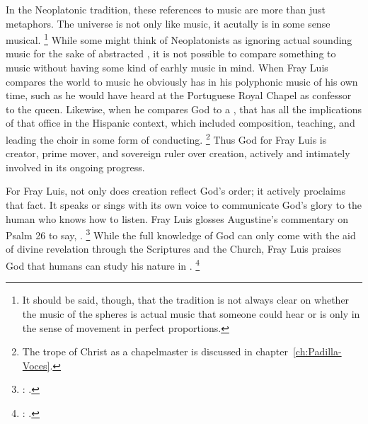 In the Neoplatonic tradition, these references to music are more than just metaphors. 
The universe is not only like music, it acutally is in some sense musical.%
	\footnote{%
	It should be said, though, that the tradition is not always clear on whether the music of the spheres is actual music that someone could hear or is only  in the sense of movement in perfect proportions.
	}
While some might think of Neoplatonists as ignoring actual sounding music for the sake of abstracted , it is not possible to compare something to music without having some kind of earhly music in mind.
When Fray Luis compares the world to music  he obviously has in his  polyphonic music of his own time, such as he would have heard at the Portuguese Royal Chapel as confessor to the queen.
Likewise, when he compares God to a , that has all the implications of that office in the Hispanic context, which included composition, teaching, and leading the choir in some form of conducting.%
	\footnote{%
	The trope of Christ as a chapelmaster is discussed in chapter~\ref{ch:Padilla-Voces}.
	}
Thus God for Fray Luis is creator, prime mover, and sovereign ruler over creation, actively and intimately involved in its ongoing progress.

For Fray Luis, not only does creation reflect God's order; it actively proclaims that fact.
It speaks or sings with its own voice to communicate God's glory to the human who knows how to listen.
Fray Luis glosses Augustine's commentary on Psalm 26 to say, .%
	\footnote{%
	\Autocite[185]{LuisdeGranada:Simbolo}: .
	}
While the full knowledge of God can only come with the aid of divine revelation through the Scriptures and the Church, Fray Luis praises God that humans can study his nature in .%
	\footnote{%
	\Autocite[186]{LuisdeGranada:Simbolo}: .
	}

